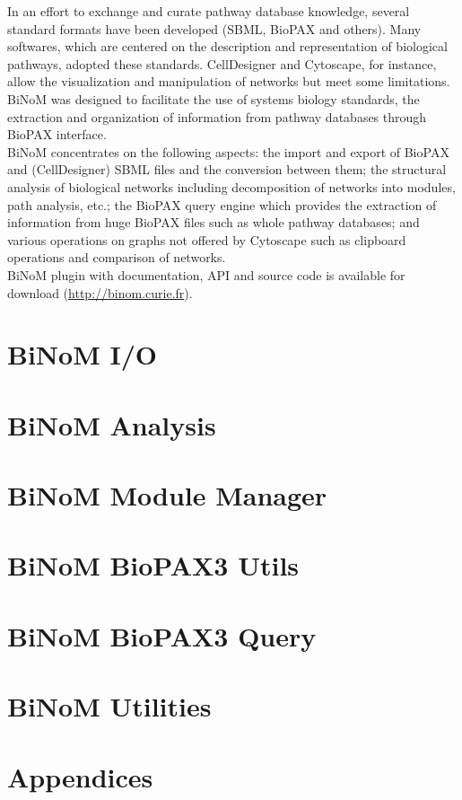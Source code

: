 \documentclass[11pt]{article}
\begin{document}
In an effort to exchange and curate pathway database knowledge, several standard
formats have been developed (SBML, BioPAX \cite{stromback2005representation} and
others). Many softwares, which are centered on the description and
representation of biological pathways, adopted these standards.
CellDesigner\cite{kitano2005using} and Cytoscape\cite{shannon2003cytoscape}, for
instance, allow the visualization and manipulation of networks but meet some
limitations. BiNoM was designed to facilitate the use of systems biology
standards, the extraction and organization of information from pathway databases
through BioPAX interface.\\

BiNoM concentrates on the following aspects: the import and export of BioPAX and
(CellDesigner) SBML files and the conversion between them; the structural
analysis of biological networks including decomposition of networks into
modules, path analysis, etc.; the BioPAX query engine which provides the
extraction of information from huge BioPAX files such as whole pathway
databases; and various operations on graphs not offered by Cytoscape such as
clipboard operations and comparison of networks.\\

BiNoM plugin with documentation, API and source code is available for download (\url{http://binom.curie.fr}).\\

\section{BiNoM I/O}

\clearpage

\section{BiNoM Analysis}

\clearpage

\section{BiNoM Module Manager}

\clearpage

\section{BiNoM BioPAX3 Utils}

\clearpage

\section{BiNoM BioPAX3 Query}

\clearpage

\section{BiNoM Utilities}

\clearpage

\section{Appendices}


\clearpage


\end{document}
